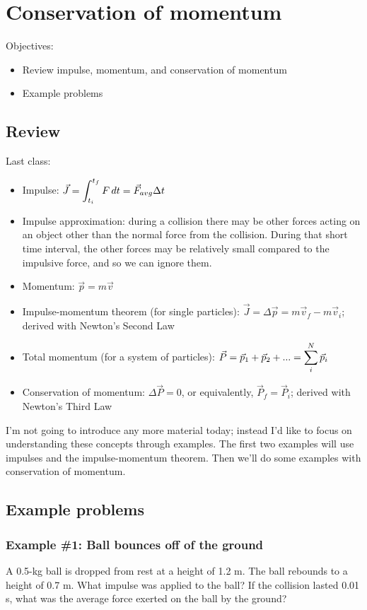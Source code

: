 \section{Conservation of momentum}
Objectives:
\begin{itemize}
\item Review impulse, momentum, and conservation of momentum
\item Example problems
\end{itemize}

\hrulefill

\subsection{Review}
Last class:
\begin{itemize}
\item Impulse: $\vec{J}=\displaystyle\int_{t_i}^{t_f}F\,dt=\vec{F}_{avg}\Delta{t}$
\item Impulse approximation: during a collision there may be other forces acting on an object other than the normal force from the collision. During that short time interval, the other forces may be relatively small compared to the impulsive force, and so we can ignore them. 
\item Momentum: $\vec{p}=m\vec{v}$
\item Impulse-momentum theorem (for single particles): $\vec{J}=\Delta{\vec{p}}=m\vec{v}_f-m\vec{v}_i$; derived with Newton's Second Law
\item Total momentum (for a system of particles): $\vec{P}=\vec{p}_1+\vec{p}_2+...=\displaystyle\sum_i^N \vec{p}_i$
\item Conservation of momentum: $\Delta{\vec{P}}=0$, or equivalently, $\vec{P}_f=\vec{P}_i$; derived with Newton's Third Law
\end{itemize}

I'm not going to introduce any more material today; instead I'd like to focus on understanding these concepts through examples. The first two examples will use impulses and the impulse-momentum theorem. Then we'll do some examples with conservation of momentum.

\subsection{Example problems}
\subsubsection{Example \#1: Ball bounces off of the ground}
A 0.5-kg ball is dropped from rest at a height of 1.2 m. The ball rebounds to a height of 0.7 m. What impulse was applied to the ball? If the collision lasted 0.01 s, what was the average force exerted on the ball by the ground?

